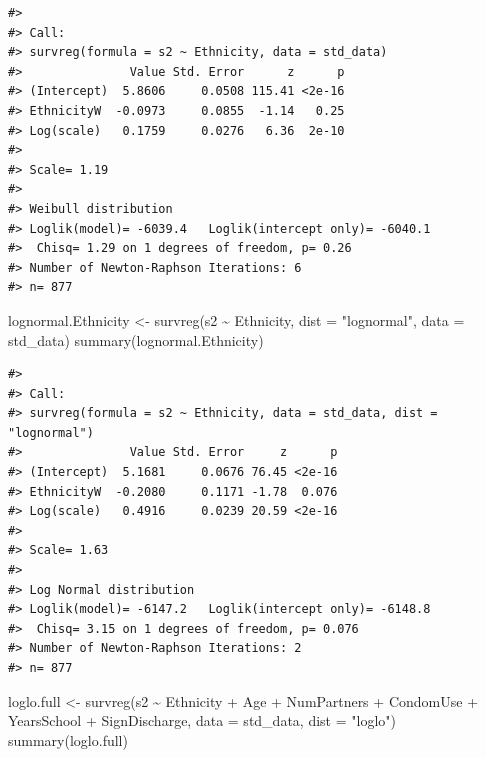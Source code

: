 \documentclass[
]{article}
\newenvironment{Shaded}{\begin{snugshade}}{\end{snugshade}}
\newcommand{\AttributeTok}[1]{\textcolor[rgb]{0.77,0.63,0.00}{#1}}
\newcommand{\FunctionTok}[1]{\textcolor[rgb]{0.00,0.00,0.00}{#1}}
\newcommand{\NormalTok}[1]{#1}
\newcommand{\OtherTok}[1]{\textcolor[rgb]{0.56,0.35,0.01}{#1}}
\newcommand{\SpecialCharTok}[1]{\textcolor[rgb]{0.00,0.00,0.00}{#1}}
\newcommand{\StringTok}[1]{\textcolor[rgb]{0.31,0.60,0.02}{#1}}
\begin{document}
\begin{verbatim}
#> 
#> Call:
#> survreg(formula = s2 ~ Ethnicity, data = std_data)
#>               Value Std. Error      z      p
#> (Intercept)  5.8606     0.0508 115.41 <2e-16
#> EthnicityW  -0.0973     0.0855  -1.14   0.25
#> Log(scale)   0.1759     0.0276   6.36  2e-10
#> 
#> Scale= 1.19 
#> 
#> Weibull distribution
#> Loglik(model)= -6039.4   Loglik(intercept only)= -6040.1
#>  Chisq= 1.29 on 1 degrees of freedom, p= 0.26 
#> Number of Newton-Raphson Iterations: 6 
#> n= 877
\end{verbatim}

\begin{Shaded}
\begin{Highlighting}[]
\NormalTok{lognormal.Ethnicity }\OtherTok{\textless{}{-}} \FunctionTok{survreg}\NormalTok{(s2 }\SpecialCharTok{\textasciitilde{}}\NormalTok{ Ethnicity, }\AttributeTok{dist =} \StringTok{"lognormal"}\NormalTok{, }\AttributeTok{data =}\NormalTok{ std\_data)}
\FunctionTok{summary}\NormalTok{(lognormal.Ethnicity)}
\end{Highlighting}
\end{Shaded}

\begin{verbatim}
#> 
#> Call:
#> survreg(formula = s2 ~ Ethnicity, data = std_data, dist = "lognormal")
#>               Value Std. Error     z      p
#> (Intercept)  5.1681     0.0676 76.45 <2e-16
#> EthnicityW  -0.2080     0.1171 -1.78  0.076
#> Log(scale)   0.4916     0.0239 20.59 <2e-16
#> 
#> Scale= 1.63 
#> 
#> Log Normal distribution
#> Loglik(model)= -6147.2   Loglik(intercept only)= -6148.8
#>  Chisq= 3.15 on 1 degrees of freedom, p= 0.076 
#> Number of Newton-Raphson Iterations: 2 
#> n= 877
\end{verbatim}

\begin{Shaded}
\begin{Highlighting}[]
\NormalTok{loglo.full }\OtherTok{\textless{}{-}} \FunctionTok{survreg}\NormalTok{(s2 }\SpecialCharTok{\textasciitilde{}}\NormalTok{ Ethnicity }\SpecialCharTok{+}\NormalTok{ Age }\SpecialCharTok{+}\NormalTok{ NumPartners }\SpecialCharTok{+}\NormalTok{ CondomUse }\SpecialCharTok{+}\NormalTok{ YearsSchool }\SpecialCharTok{+}\NormalTok{ SignDischarge, }\AttributeTok{data =}\NormalTok{ std\_data, }\AttributeTok{dist =} \StringTok{"loglo"}\NormalTok{)}
\FunctionTok{summary}\NormalTok{(loglo.full)}
\end{Highlighting}
\end{Shaded}
\end{document}
